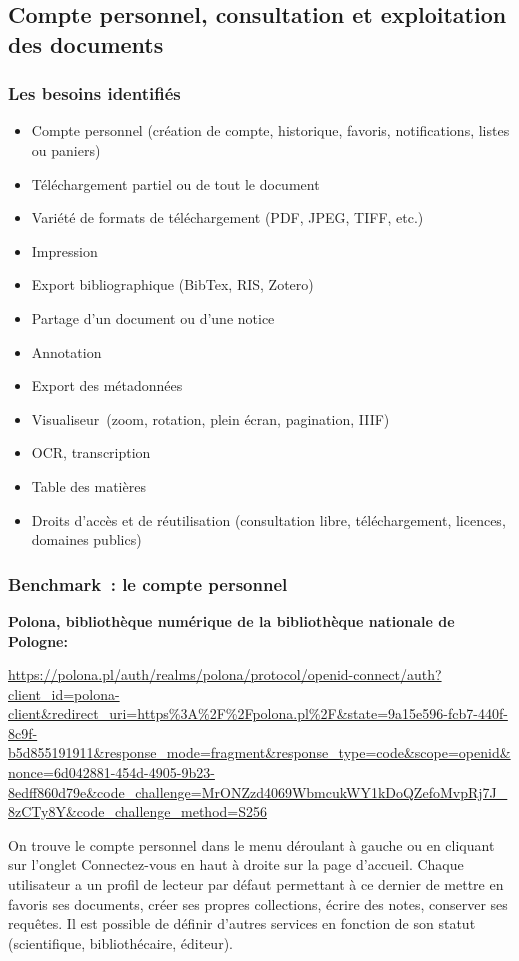 \subsection{Compte personnel, consultation et exploitation des documents}
\subsubsection{Les besoins identifiés}

\begin{itemize}
	\item Compte personnel (création de compte, historique, favoris, notifications, listes ou paniers)
\item Téléchargement partiel ou de tout le document
\item Variété de formats de téléchargement (PDF, JPEG, TIFF, etc.)
\item Impression
\item Export bibliographique (BibTex, RIS, Zotero)
\item Partage d’un document ou d’une notice
\item Annotation 
\item Export des métadonnées
\item Visualiseur (zoom, rotation, plein écran, pagination, IIIF)
\item OCR, transcription 
\item Table des matières
\item Droits d’accès et de réutilisation (consultation libre, téléchargement, licences, domaines publics)
\end{itemize}

\subsubsection{Benchmark : le compte personnel}

\textbf{Polona, bibliothèque numérique de la bibliothèque nationale de Pologne:}

\url{https://polona.pl/auth/realms/polona/protocol/openid-connect/auth?client_id=polona-client&redirect_uri=https%3A%2F%2Fpolona.pl%2F&state=9a15e596-fcb7-440f-8c9f-b5d855191911&response_mode=fragment&response_type=code&scope=openid&nonce=6d042881-454d-4905-9b23-8edff860d79e&code_challenge=MrONZzd4069WbmcukWY1kDoQZefoMvpRj7J_8zCTy8Y&code_challenge_method=S256}
 
On trouve le compte personnel dans le menu déroulant à gauche ou en cliquant sur l’onglet Connectez-vous en haut à droite sur la page d’accueil. 
Chaque utilisateur a un profil de lecteur par défaut permettant à ce dernier de mettre en favoris ses documents, créer ses propres collections, écrire des notes, conserver ses requêtes. 
Il est possible de définir d’autres services en fonction de son statut (scientifique, bibliothécaire, éditeur).

